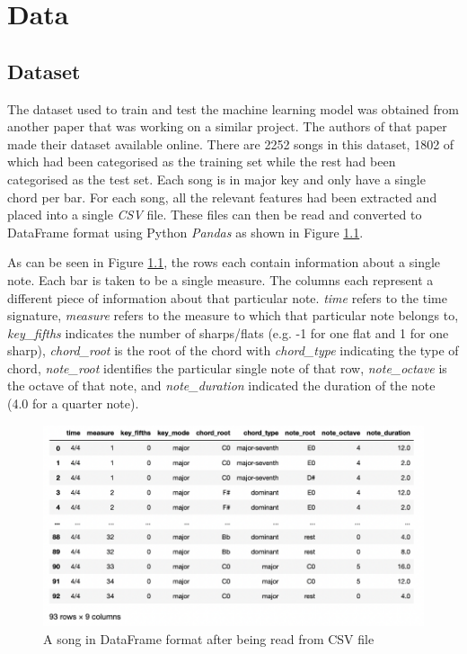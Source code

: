 
\chapter{Data} %

\label{Chapter3} %


\section{Dataset}

The dataset used to train and test the machine learning model was obtained from another paper that was working on a similar project. The authors of that paper made their dataset available online. There are 2252 songs in this dataset, 1802 of which had been categorised as the training set while the rest had been categorised as the test set. Each song is in major key and only have a single chord per bar. For each song, all the relevant features had been extracted and placed into a single \emph{CSV} file. These files can then be read and converted to DataFrame format using Python \emph{Pandas} as shown in Figure \ref{fig:CSV_DF}.

As can be seen in Figure \ref{fig:CSV_DF}, the rows each contain information about a single note. Each bar is taken to be a single measure. The columns each represent a different piece of information about that particular note. \emph{time} refers to the time signature, \emph{measure} refers to the measure to which that particular note belongs to, \emph{key\_fifths} indicates the number of sharps/flats (e.g. -1 for one flat and 1 for one sharp), \emph{chord\_root} is the root of the chord with \emph{chord\_type} indicating the type of chord, \emph{note\_root} identifies the particular single note of that row, \emph{note\_octave} is the octave of that note, and \emph{note\_duration} indicated the duration of the note (4.0 for a quarter note).

\begin{figure}
\centering
\includegraphics{Figures/CSV dataframe}
\decoRule
\caption{A song in DataFrame format after being read from CSV file}
\label{fig:CSV_DF}
\end{figure}

